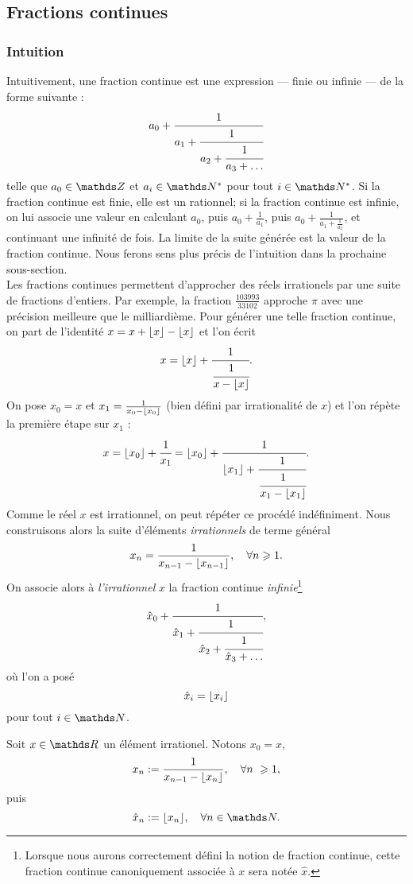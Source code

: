 \subsection{Fractions continues}
\subsubsection{Intuition}

Intuitivement, une fraction continue est une expression — finie ou infinie — de
la forme suivante : \[a_0 + \cfrac{1}{a_1 + \cfrac{1}{a_2 + \cfrac{1}{a_3 +
\dots}}}\] telle que $a_0\in \Z$ et $a_i \in \N^*$ pour tout $i\in \N^*$.  Si
la fraction continue est finie, elle est un rationnel; si la fraction continue
est infinie, on lui associe une valeur en calculant $a_0$, puis $a_0 +
\frac{1}{a_1}$, puis $a_0 + \frac{1}{a_1 +\frac{1}{a_2}}$, et continuant une
infinité de fois. La limite de la suite générée est la \og{} valeur \fg{} de la
fraction continue. Nous ferons sens plus précis de l'intuition dans la
prochaine sous-section. \\

Les fractions continues permettent d'approcher des réels irrationels par une
suite de fractions d'entiers.  Par exemple, la fraction $\frac{103 993}{33
102}$ approche $\pi$ avec une précision meilleure que le milliardième. Pour
générer une telle fraction continue, on part de l'identité $x = x + \lfloor x\rfloor -
\lfloor x\rfloor$ et l'on écrit \[x = \lfloor x\rfloor + \cfrac{1}{\cfrac{1}{x - \lfloor x\rfloor}}.\] On
pose $x_0 = x$ et $x_1 = \frac{1}{x_0 - \lfloor x_0\rfloor}$ (bien défini par
irrationalité de $x$) et l'on répète la première étape sur $x_1$ : \[x =
\lfloor x_0\rfloor + \cfrac{1}{x_1} = \lfloor x_0\rfloor + \cfrac{1}{\lfloor x_1\rfloor +
\cfrac{1}{\cfrac{1}{x_1 - \lfloor x_1\rfloor}}}.\] Comme le réel $x$ est irrationnel, on
peut répéter ce procédé indéfiniment. Nous construisons alors la suite
d'éléments \emph{irrationnels} de terme général \[x_n = \frac{1}{x_{n-1} -
\lfloor x_{n-1}\rfloor}, \quad \forall n \geqslant 1.\] On associe alors à
\emph{l'irrationnel} $x$ la fraction continue \emph{infinie}\footnote{Lorsque
nous aurons correctement défini la notion de fraction continue, cette fraction
continue canoniquement associée à $x$ sera notée $\hat{x}$.} \[\hat{x}_0 +
\cfrac{1}{\hat{x}_1 + \cfrac{1}{\hat{x}_2 + \cfrac{1}{\hat{x}_3 + \dots}}},\]
où l'on a posé \[\hat{x}_i = \lfloor x_i\rfloor\] pour tout $i\in \N$.

\begin{notation}\label{notations}
	Soit $x\in \R$ un élément irrationel. Notons $x_0 = x$, \[x_n :=
	\frac{1}{x_{n-1} - \ent{x_n}}, \quad \forall n \geq 1,\] puis \[\hat{x}_n
	:= \ent{x_n}, \quad \forall n\in \N.\]
\end{notation}

